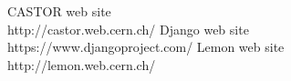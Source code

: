 \begin{thebibliography}{99}
 CASTOR web site\\ http://castor.web.cern.ch/
 Django web site\\ https://www.djangoproject.com/
 Lemon web site\\ http://lemon.web.cern.ch/
\end{thebibliography}
